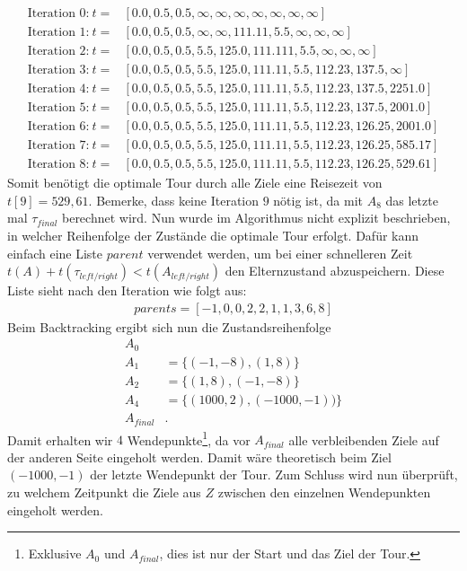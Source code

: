 \documentclass[german,version-2019-11]{uzl-thesis}
\begin{document}
\begin{example}
\begin{align*}
\text{Iteration 0:}~t=&[0.0, 0.5, 0.5, \infty, \infty, \infty, \infty, \infty, \infty, \infty] \\
\text{Iteration 1:}~t=&[0.0, 0.5, 0.5, \infty, \infty, 111.11, 5.5, \infty, \infty, \infty] \\
\text{Iteration 2:}~t=&[0.0, 0.5, 0.5, 5.5, 125.0, 111.111, 5.5, \infty, \infty, \infty] \\
\text{Iteration 3:}~t=&[0.0, 0.5, 0.5, 5.5, 125.0, 111.11, 5.5, 112.23, 137.5, \infty] \\
\text{Iteration 4:}~t=&[0.0, 0.5, 0.5, 5.5, 125.0, 111.11, 5.5, 112.23, 137.5, 2251.0] \\
\text{Iteration 5:}~t=&[0.0, 0.5, 0.5, 5.5, 125.0, 111.11, 5.5, 112.23, 137.5, 2001.0] \\
\text{Iteration 6:}~t=&[0.0, 0.5, 0.5, 5.5, 125.0, 111.11, 5.5, 112.23, 126.25, 2001.0] \\
\text{Iteration 7:}~t=&[0.0, 0.5, 0.5, 5.5, 125.0, 111.11, 5.5, 112.23, 126.25, 585.17] \\
\text{Iteration 8:}~t=&[0.0, 0.5, 0.5, 5.5, 125.0, 111.11, 5.5, 112.23, 126.25, 529.61]
\end{align*}
Somit benötigt die optimale Tour durch alle Ziele eine Reisezeit von $t[9]=529,61$. Bemerke, dass keine Iteration $9$ nötig ist, da mit $A_{8}$ das letzte mal $\tau_{final}$ berechnet wird. Nun wurde im Algorithmus nicht explizit beschrieben, in welcher Reihenfolge der Zustände die optimale Tour erfolgt. Dafür kann einfach eine Liste $parent$ verwendet werden, um bei einer schnelleren Zeit {$t(A) + t(\tau_{left/right}) < t(A_{left/right})$} den Elternzustand abzuspeichern. Diese Liste sieht nach den Iteration wie folgt aus:
\begin{align*}
parents = [-1, 0, 0, 2, 2, 1, 1, 3, 6, 8]
\end{align*}
Beim Backtracking ergibt sich nun die Zustandsreihenfolge
\begin{align*}
A_0&\\
A_1&=\{(-1, -8), (1, 8)\}\\
A_2&=\{(1, 8), (-1, -8)\}\\ 
A_4&=\{(1000, 2), (-1000, -1))\}\\
A_{final}&.
\end{align*}
Damit erhalten wir $4$ Wendepunkte\footnote{Exklusive $A_0$ und $A_{final}$, dies ist nur der Start und das Ziel der Tour.}, da vor $A_{final}$ alle verbleibenden Ziele auf der anderen Seite  eingeholt werden. Damit wäre theoretisch beim Ziel $(-1000,-1)$ der letzte Wendepunkt der Tour. Zum Schluss wird nun überprüft, zu welchem Zeitpunkt die Ziele aus $Z$ zwischen den einzelnen Wendepunkten eingeholt werden.

\end{example}
\end{document}
